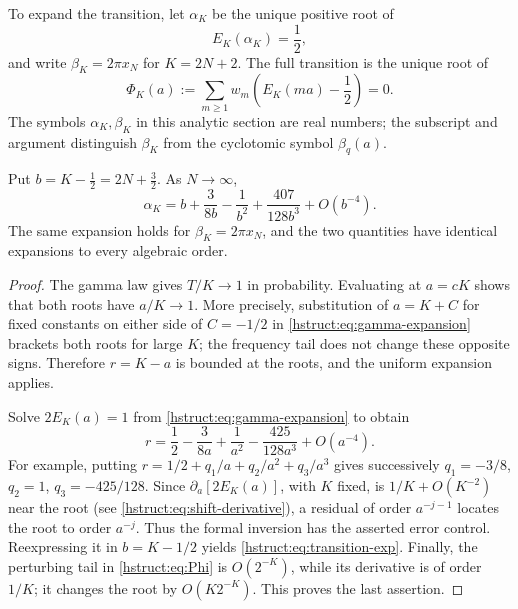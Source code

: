 To expand the transition, let $\alpha_K$ be the unique positive root of
\begin{equation}\label{hstruct:eq:alpha}
 E_K(\alpha_K)=\frac12,
\end{equation}
and write $\beta_K=2\pi x_N$ for $K=2N+2$. The full transition is
the unique root of
\begin{equation}\label{hstruct:eq:Phi}
 \Phi_K(a):=\sum_{m\ge1}w_m\left(E_K(ma)-\frac12\right)=0.
\end{equation}
The symbols $\alpha_K,\beta_K$ in this analytic section are real
numbers; the subscript and argument distinguish $\beta_K$ from the
cyclotomic symbol $\beta_q(a)$.

\begin{theorem}\label{hstruct:thm:transition-exp}
Put $b=K-\tfrac12=2N+\tfrac32$. As $N\to\infty$,
\begin{equation}\label{hstruct:eq:transition-exp}
 \alpha_K=b+\frac3{8b}-\frac1{b^2}
                +\frac{407}{128b^3}+O(b^{-4}).
\end{equation}
The same expansion holds for $\beta_K=2\pi x_N$, and the two
quantities have identical expansions to every algebraic order.
\end{theorem}
\begin{proof}
The gamma law gives $T/K\to1$ in probability. Evaluating at $a=cK$
shows that both roots have $a/K\to1$. More precisely, substitution
of $a=K+C$ for fixed constants on either side of $C=-1/2$
in \eqref{hstruct:eq:gamma-expansion} brackets both roots for large $K$;
the frequency tail does not change these opposite signs. Therefore
$r=K-a$ is bounded at the roots, and the uniform expansion applies.

Solve $2E_K(a)=1$ from \eqref{hstruct:eq:gamma-expansion} to obtain
\[
 r=\frac12-\frac3{8a}+\frac1{a^2}
                    -\frac{425}{128a^3}+O(a^{-4}).
\]
For example, putting $r=1/2+q_1/a+q_2/a^2+q_3/a^3$ gives
successively $q_1=-3/8$, $q_2=1$, $q_3=-425/128$.
Since $\partial_a[2E_K(a)]$, with $K$ fixed, is
$1/K+O(K^{-2})$ near the root (see \eqref{hstruct:eq:shift-derivative}),
a residual of order
$a^{-j-1}$ locates the root to order $a^{-j}$. Thus the formal
inversion has the asserted error control. Reexpressing it in
$b=K-1/2$ yields \eqref{hstruct:eq:transition-exp}. Finally, the perturbing
tail in \eqref{hstruct:eq:Phi} is $O(2^{-K})$, while its derivative is of
order $1/K$; it changes the root by $O(K2^{-K})$. This proves the
last assertion.
\end{proof}

